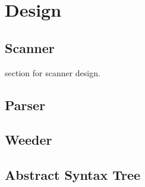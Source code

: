\chapter{Design}
\section{Scanner}
section for scanner design.

\section{Parser}

\section{Weeder}

\section{Abstract Syntax Tree}